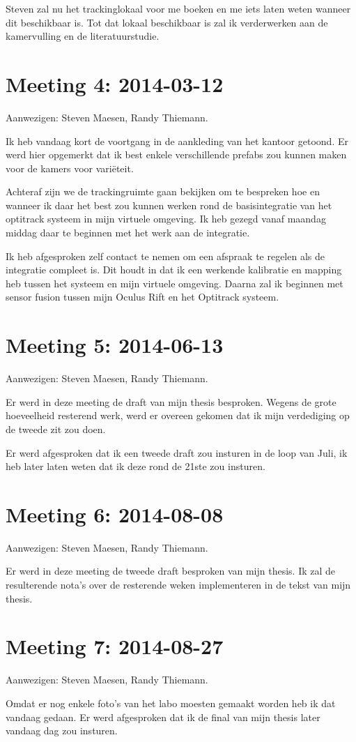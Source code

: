 Steven zal nu het trackinglokaal voor me boeken en me iets laten weten wanneer
dit beschikbaar is. Tot dat lokaal beschikbaar is zal ik verderwerken aan de
kamervulling en de literatuurstudie.


\section{Meeting 4: 2014-03-12}
Aanwezigen: Steven Maesen, Randy Thiemann.

Ik heb vandaag kort de voortgang in de aankleding van het kantoor getoond. Er 
werd hier opgemerkt dat ik best enkele verschillende prefabs zou kunnen maken
voor de kamers voor variëteit.

Achteraf zijn we de trackingruimte gaan bekijken om te bespreken hoe en wanneer
ik daar het best zou kunnen werken rond de basisintegratie van het optitrack
systeem in mijn virtuele omgeving. Ik heb gezegd vanaf maandag middag daar te
beginnen met het werk aan de integratie.

Ik heb afgesproken zelf contact te nemen om een afspraak te regelen als de
integratie compleet is. Dit houdt in dat ik een werkende kalibratie en mapping
heb tussen het systeem en mijn virtuele omgeving. Daarna zal ik beginnen met
sensor fusion tussen mijn Oculus Rift en het Optitrack systeem.

\section{Meeting 5: 2014-06-13}
Aanwezigen: Steven Maesen, Randy Thiemann.

Er werd in deze meeting de draft van mijn thesis besproken. Wegens de grote
hoeveelheid resterend werk, werd er overeen gekomen dat ik mijn verdediging op de
tweede zit zou doen.

Er werd afgesproken dat ik een tweede draft zou insturen in de loop van Juli,
ik heb later laten weten dat ik deze rond de 21ste zou insturen.


\section{Meeting 6: 2014-08-08}
Aanwezigen: Steven Maesen, Randy Thiemann.

Er werd in deze meeting de tweede draft besproken van mijn thesis. Ik zal de
resulterende nota's over de resterende weken implementeren in de tekst van mijn
thesis.


\section{Meeting 7: 2014-08-27}
Aanwezigen: Steven Maesen, Randy Thiemann.

Omdat er nog enkele foto's van het labo moesten gemaakt worden heb ik dat vandaag
gedaan. Er werd afgesproken dat ik de final van mijn thesis later vandaag dag zou 
insturen.